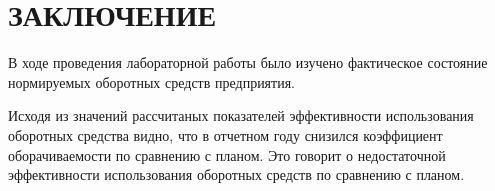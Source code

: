 \section*{ЗАКЛЮЧЕНИЕ}

В ходе проведения лабораторной работы было изучено фактическое 
состояние нормируемых оборотных средств предприятия.

Исходя из значений рассчитаных показателей эффективности использования 
оборотных средства видно, что в отчетном году снизился коэффициент оборачиваемости
по сравнению с планом. Это говорит о недостаточной эффективности
использования оборотных средств по сравнению с планом.

\newpage
